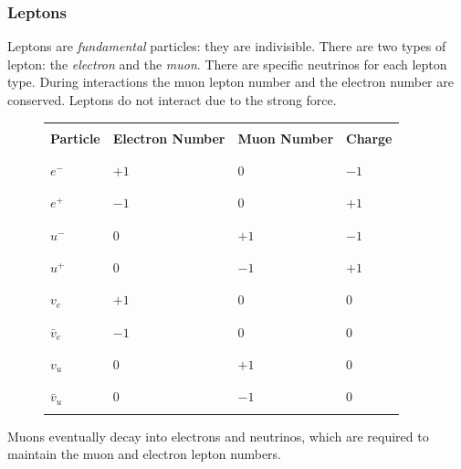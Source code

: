 \documentclass[12pt]{article}
\begin{document}
\subsubsection{Leptons}
\label{sec:org51c8f9c}

Leptons are \emph{fundamental} particles: they are indivisible. There are two types of lepton: the \emph{electron} and the \emph{muon}. There are specific neutrinos for each lepton type. During interactions the muon lepton number and the electron number are conserved. Leptons do not interact due to the strong force.

\begin{figure}[H]
\small
\begin{longtable}{ |C{0.2\textwidth}|C{0.2\textwidth}|C{0.2\textwidth}|C{0.2\textwidth}| }
\hline
&&&\\*
\textbf{Particle} & \textbf{Electron Number} & \textbf{Muon Number} & \textbf{Charge} \\*
&&&\\*
\hline
\endhead
&&&\\*
$e^-$&$+1$&$0$&$-1$\\*
&&&\\*
\hline
&&&\\*
$e^+$&$-1$&$0$&$+1$\\*
&&&\\*
\hline
&&&\\*
$u^-$&$0$&$+1$&$-1$\\*
&&&\\*
\hline
&&&\\*
$u^+$&$0$&$-1$&$+1$\\*
&&&\\*
\hline
&&&\\*
$v_e$&$+1$&$0$&$0$\\*
&&&\\*
\hline
&&&\\*
$\bar{v}_e$&$-1$&$0$&$0$\\*
&&&\\*
\hline
&&&\\*
$v_u$&$0$&$+1$&$0$\\*
&&&\\*
\hline
&&&\\*
$\bar{v}_u$&$0$&$-1$&$0$\\*
&&&\\*
\hline
\end{longtable}
\normalsize
\end{figure}

Muons eventually decay into electrons and neutrinos, which are required to maintain the muon and electron lepton numbers.
\end{document}
